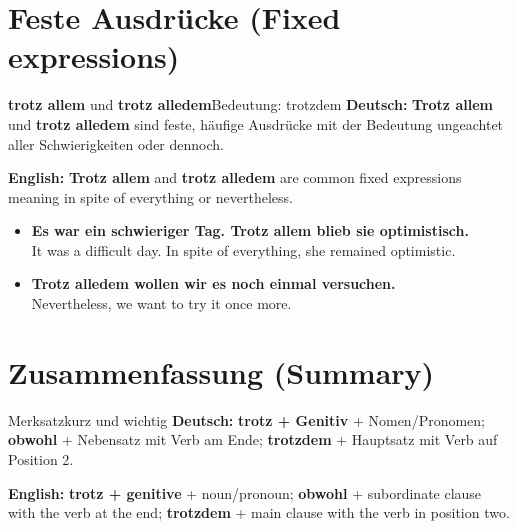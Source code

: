 \documentclass[a4paper,11pt]{article}
\newcommand{\GermanText}[1]{\textbf{Deutsch: }#1\par}
\newcommand{\EnglishText}[1]{{\small\color{SoftGray}\textbf{English: }#1\par}}
\newcommand{\ExampleItem}[2]{\item \textbf{#1}\\{\small\color{SoftGray}#2}}
\begin{document}
\section{Feste Ausdrücke \textnormal{(Fixed expressions)}}
\begin{grammarentry}{\textbf{trotz allem} und \textbf{trotz alledem}}{Bedeutung: trotzdem}
\GermanText{\textbf{Trotz allem} und \textbf{trotz alledem} sind feste, häufige Ausdrücke mit der Bedeutung \glqq ungeachtet aller Schwierigkeiten\grqq{} oder \glqq dennoch\grqq.}
\EnglishText{\textbf{Trotz allem} and \textbf{trotz alledem} are common fixed expressions meaning \glqq in spite of everything\grqq{} or \glqq nevertheless\grqq.}
\end{grammarentry}
\begin{exbox}
\begin{itemize}
\ExampleItem{Es war ein schwieriger Tag. Trotz allem blieb sie optimistisch.}{It was a difficult day. In spite of everything, she remained optimistic.}
\ExampleItem{Trotz alledem wollen wir es noch einmal versuchen.}{Nevertheless, we want to try it once more.}
\end{itemize}
\end{exbox}

\section{Zusammenfassung \textnormal{(Summary)}}
\begin{grammarentry}{Merksatz}{kurz und wichtig}
\GermanText{\textbf{trotz + Genitiv} + Nomen/Pronomen; \textbf{obwohl} + Nebensatz mit Verb am Ende; \textbf{trotzdem} + Hauptsatz mit Verb auf Position 2.}
\EnglishText{\textbf{trotz + genitive} + noun/pronoun; \textbf{obwohl} + subordinate clause with the verb at the end; \textbf{trotzdem} + main clause with the verb in position two.}
\end{grammarentry}
\end{document}
